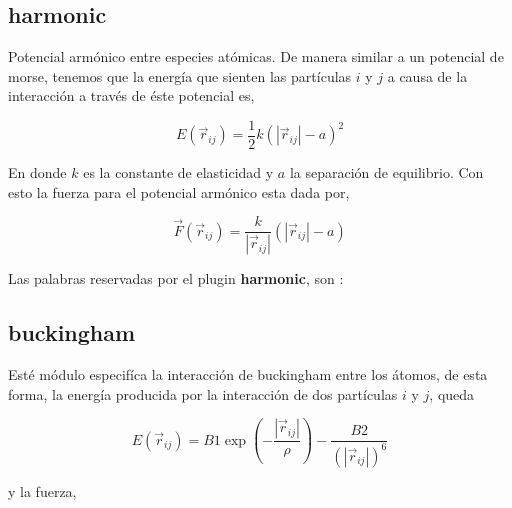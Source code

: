 
\subsection{harmonic}
Potencial arm\'onico entre especies at\'omicas. De manera similar a un potencial de morse, tenemos que la energ\'ia que sienten las part\'iculas $i$ y $j$ a causa de la interacci\'on a trav\'es de \'este potencial es,

$$E(\vec{r}_{ij}) = \frac{1}{2}k\left(|\vec{r}_{ij}|-a\right)^2$$

En donde $k$ es la constante de elasticidad y $a$ la separaci\'on de equilibrio. Con esto la fuerza para el potencial arm\'onico esta dada por,

$$\vec{F}(\vec{r}_{ij}) = \frac{k}{|\vec{r}_{ij}|}\left(|\vec{r}_{ij}|-a\right)$$

Las palabras reservadas por el plugin \textbf{harmonic}, son :


\subsection{buckingham}

Est\'e m\'odulo especif\'ica la interacci\'on de buckingham entre los \'atomos, de esta forma, la energ\'ia producida por la interacci\'on de dos part\'iculas $i$ y $j$, queda

$$E(\vec{r}_{ij}) = B1 \exp\left(-\frac{|\vec{r}_{ij}|}{\rho}\right) - \frac{B2}{(|\vec{r}_{ij}|)^6}$$

y la fuerza,

